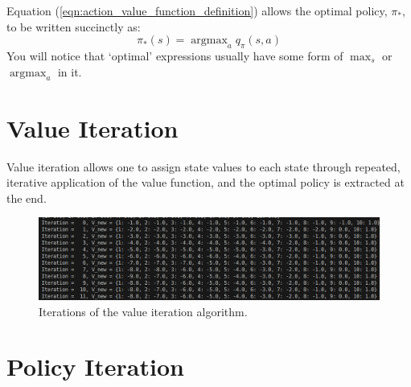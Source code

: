 \documentclass[a4paper,11pt]{article}
\DeclareMathOperator*{\argmax}{argmax}
\begin{document}
Equation (\ref{eqn:action_value_function_definition}) allows the optimal policy, $\pi_{*}$, to be written succinctly as:
\begin{equation} \label{eqn:optimal_policy_wrt_action_values}
    \pi_{*}(s) = \argmax_a q_{\pi}(s,a)
\end{equation}
You will notice that `optimal' expressions usually have some form of $\max_s$ or $\argmax_a$ in it.


\section{Value Iteration}

Value iteration allows one to assign state values to each state through repeated, iterative application of the value function, and the optimal policy is extracted at the end.  



\begin{figure}
    \includegraphics[width=\textwidth]{images/iters-of-value-iteration-1d-grid-world-code-output.png}
    \caption{Iterations of the value iteration algorithm.}
    \label{fig:iters-of-value-iteration-1d-grid-world-code-output}
\end{figure}


\section{Policy Iteration}
\end{document}
